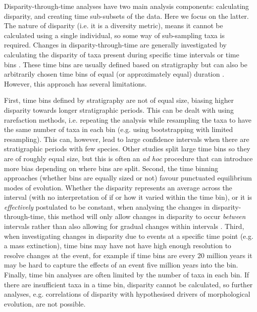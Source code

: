 \documentclass[12pt,a4paper]{article}
\begin{document}
Disparity-through-time analyses have two main analysis components: calculating disparity, and creating time sub-subsets of the data. 
Here we focus on the latter.
The nature of disparity (i.e. it is a diversity metric), means it cannot be calculated using a single individual, so some way of sub-sampling taxa is required.
Changes in disparity-through-time are generally investigated by calculating the disparity of taxa present during specific time intervals or time bins \citep[e.g][]{cisneros2010,prentice2011,Hughes20082013,hopkinsdecoupling2013,bentonmodels2014,bensonfaunal2014}.
These time bins are usually defined based on stratigraphy \citep[e.g.][]{cisneros2010,prentice2011,Hughes20082013,bentonmodels2014} but can also be arbitrarily chosen time bins of equal (or approximately equal) duration \citep{Butler2012,hopkinsdecoupling2013,bensonfaunal2014}.
However, this approach has several limitations.

First, time bins defined by stratigraphy are not of equal size, biasing higher disparity towards longer stratigraphic periods. 
This can be dealt with using rarefaction methods, i.e. repeating the analysis while resampling the taxa to have the same number of taxa in each bin (e.g. using bootstrapping with limited resampling).
This can, however, lead to large confidence intervals when there are stratigraphic periods with few species.
Other studies split large time bins so they are of roughly equal size, but this is often an \textit{ad hoc} procedure that can introduce more bias depending on where bins are split.
Second, the time binning approaches (whether bins are equally sized or not) favour punctuated equilibrium modes of evolution.
Whether the disparity represents an average across the interval (with no interpretation of if or how it varied within the time bin), or it is \textit{effectively} postulated to be constant, when analysing the changes in disparity-through-time, this method will only allow changes in disparity to occur \textit{between} intervals rather than also allowing for gradual changes within intervals \citep[a pattern that is fairly common in the fossil record;][]{Hunt21042015}.
Third, when investigating changes in disparity due to events at a specific time point (e.g. a mass extinction), time bins may have not have high enough resolution to resolve changes at the event, for example if time bins are every 20 million years it may be hard to capture the effects of an event five million years into the bin.
Finally, time bin analyses are often limited by the number of taxa in each bin.
If there are insufficient taxa in a time bin, disparity cannot be calculated, so further analyses, e.g. correlations of disparity with hypothesised drivers of morphological evolution, are not possible.
\end{document}
